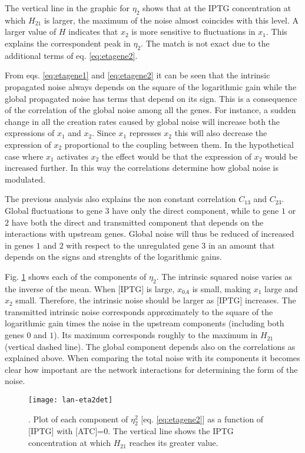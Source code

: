 The vertical line in the graphic for $\eta_2$ shows that at the IPTG concentration at which $H_{21}$ is larger, the maximum of the noise almost coincides with this level. A larger value of $H$ indicates that $x_2$ is more sensitive to fluctuations in $x_1$. This explains the correspondent peak in $\eta_2$. The match is not exact due to the additional terms of eq. \eqref{eq:etagene2}. 

From eqs. \eqref{eq:etagene1} and \eqref{eq:etagene2} it can be seen that the intrinsic propagated noise always depends on the square of the logarithmic gain while the global propagated noise has terms that depend on its sign. This is a consequence of the correlation of the global noise among all the genes. For instance, a sudden change in all the creation rates caused by global noise will increase both the expressions of $x_1$ and $x_2$. Since $x_1$ represses $x_2$ this will also decrease the expression of $x_2$ proportional to the coupling between them. In the hypothetical case where $x_1$ activates $x_2$ the effect would be that the expression of $x_2$ would be increased further. In this way the correlations determine how global noise is modulated.

The previous analysis also explains the non constant correlation $C_{13}$ and $C_{23}$. Global fluctuations to gene $3$ have only the direct component, while to gene $1$ or $2$ have both the direct and transmitted component that depends on the interactions with upstream genes. Global noise will thus be reduced of increased in genes $1$ and $2$ with respect to the unregulated gene $3$ in an amount that depends on the signs and strenghts of the logarithmic gains.

Fig. \ref{fig:lan-eta2det} shows each of the components of $\eta_2$. The intrinsic squared noise varies as the inverse of the mean. When [IPTG] is large, $x_{0A}$ is small, making $x_1$ large and $x_2$ small. Therefore, the intrinsic noise should be larger as [IPTG] increases. The transmitted intrinsic noise corresponds approximately to the square of the logarithmic gain times the noise in the upstream components (including both genes $0$ and $1$). Its maximum corresponds roughly to the maximum in $H_{21}$ (vertical dashed line). The global component depends also on the correlations as explained above. When comparing the total noise with its components it becomes clear how important are the network interactions for determining the form of the noise.
\begin{figure}[H]
  \centering
  \texttt{[image: lan-eta2det]}
  \caption[Components of the noise]{\label{fig:lan-eta2det}. Plot of each component of $\eta_2^2$ [eq. \eqref{eq:etagene2}] as a function of [IPTG] with [ATC]=0. The vertical line shows the IPTG concentration at which $H_{21}$ reaches its greater value.}
\end{figure}

